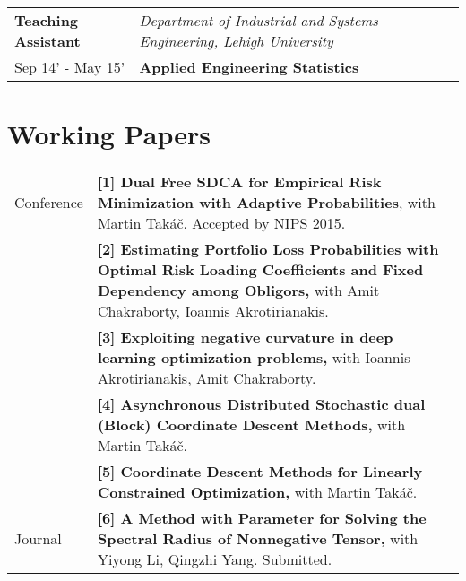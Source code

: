 \documentclass[a4paper,11pt]{article} %
\newcommand{\lst}[1]{\quad\footnotesize{$\blacktriangleright$ #1.}}
\begin{document}
\begin{longtable}{>{\centering}p{3.35cm}|p{14cm}}

    \small{\textbf{Teaching Assistant}}& \textit{Department of Industrial and Systems Engineering, Lehigh University}\\
    \small{Sep 14' - May 15'}&\textbf{Applied Engineering Statistics}\\ 
\end{longtable}

\section{Working Papers}
\begin{longtable}{>{\centering}p{3.3cm}|p{14cm}}
    Conference &
    \textbf{[1] Dual Free SDCA for Empirical Risk Minimization with Adaptive Probabilities}, with Martin Takáč. Accepted by NIPS 2015.\\
    &\textbf{[2] Estimating Portfolio Loss Probabilities with Optimal Risk Loading Coefficients and Fixed Dependency among Obligors,} with Amit Chakraborty, Ioannis Akrotirianakis. \\
    &\textbf{[3] Exploiting negative curvature in deep learning optimization problems,} with Ioannis Akrotirianakis, Amit Chakraborty.\\
    &\textbf{[4] Asynchronous Distributed Stochastic dual (Block) Coordinate Descent Methods,} with Martin Takáč. \\
    \pagebreak
    &\textbf{[5] Coordinate Descent Methods for Linearly Constrained Optimization,} with Martin Takáč.\\
    Journal &\textbf{[6] A Method with Parameter for Solving the Spectral Radius of Nonnegative Tensor,} with Yiyong Li, Qingzhi Yang. Submitted.
\end{longtable}
\end{document}
